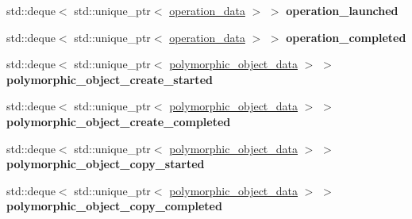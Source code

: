 \begin{DoxyCompactItemize}
\item 
\mbox{\label{structgko_1_1log_1_1Record_1_1logged__data_af86d2b41efc6edefe7175ed22a7d6063}} 
std\+::deque$<$ std\+::unique\+\_\+ptr$<$ \hyperlink{structgko_1_1log_1_1operation__data}{operation\+\_\+data} $>$ $>$ {\bfseries operation\+\_\+launched}
\item 
\mbox{\label{structgko_1_1log_1_1Record_1_1logged__data_af4fa02728a22bba66dcac986e1086463}} 
std\+::deque$<$ std\+::unique\+\_\+ptr$<$ \hyperlink{structgko_1_1log_1_1operation__data}{operation\+\_\+data} $>$ $>$ {\bfseries operation\+\_\+completed}
\item 
\mbox{\label{structgko_1_1log_1_1Record_1_1logged__data_a81397efee745a6b99b571708927825eb}} 
std\+::deque$<$ std\+::unique\+\_\+ptr$<$ \hyperlink{structgko_1_1log_1_1polymorphic__object__data}{polymorphic\+\_\+object\+\_\+data} $>$ $>$ {\bfseries polymorphic\+\_\+object\+\_\+create\+\_\+started}
\item 
\mbox{\label{structgko_1_1log_1_1Record_1_1logged__data_a527693f20e8483842f9eb18fe4e1708e}} 
std\+::deque$<$ std\+::unique\+\_\+ptr$<$ \hyperlink{structgko_1_1log_1_1polymorphic__object__data}{polymorphic\+\_\+object\+\_\+data} $>$ $>$ {\bfseries polymorphic\+\_\+object\+\_\+create\+\_\+completed}
\item 
\mbox{\label{structgko_1_1log_1_1Record_1_1logged__data_ab6f3beebd910a65b81f61e77160eb17b}} 
std\+::deque$<$ std\+::unique\+\_\+ptr$<$ \hyperlink{structgko_1_1log_1_1polymorphic__object__data}{polymorphic\+\_\+object\+\_\+data} $>$ $>$ {\bfseries polymorphic\+\_\+object\+\_\+copy\+\_\+started}
\item 
\mbox{\label{structgko_1_1log_1_1Record_1_1logged__data_a1a92ff64d66a2d35fb6230f126f5b575}} 
std\+::deque$<$ std\+::unique\+\_\+ptr$<$ \hyperlink{structgko_1_1log_1_1polymorphic__object__data}{polymorphic\+\_\+object\+\_\+data} $>$ $>$ {\bfseries polymorphic\+\_\+object\+\_\+copy\+\_\+completed}
\item 
\mbox{\label{structgko_1_1log_1_1Record_1_1logged__data_a9d4b67ab1340cffe6633c31f380aa6e9}} 

\end{DoxyCompactItemize}
